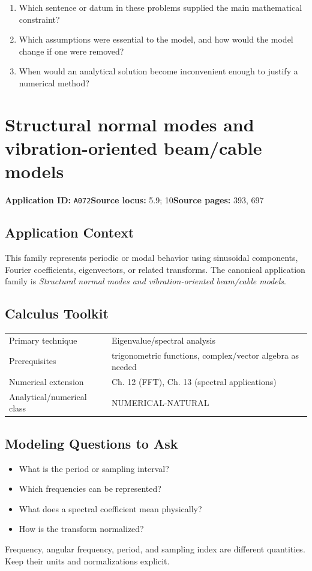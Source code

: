 \documentclass[11pt]{book}
\newcommand{\pid}[1]{\texttt{#1}}
\begin{document}
\begin{reflectionbox}\begin{enumerate}
\item Which sentence or datum in these problems supplied the main mathematical constraint?
\item Which assumptions were essential to the model, and how would the model change if one were removed?
\item When would an analytical solution become inconvenient enough to justify a numerical method?
\end{enumerate}\end{reflectionbox}
\chapter{Structural normal modes and vibration-oriented beam/cable models}\label{app:A072}
\textbf{Application ID:} \pid{A072}\quad \textbf{Source locus:} 5.9; 10\quad \textbf{Source pages:} 393, 697
\section*{Application Context}
This family represents periodic or modal behavior using sinusoidal components, Fourier coefficients, eigenvectors, or related transforms. The canonical application family is \emph{Structural normal modes and vibration-oriented beam/cable models}.
\section*{Calculus Toolkit}
\begin{tabularx}{\textwidth}{@{}lX@{}}\toprule
Primary technique & Eigenvalue/spectral analysis \\
Prerequisites & trigonometric functions, complex/vector algebra as needed \\
Numerical extension & Ch. 12 (FFT), Ch. 13 (spectral applications) \\
Analytical/numerical class & NUMERICAL-NATURAL \\
\bottomrule\end{tabularx}
\section*{Modeling Questions to Ask}\begin{itemize}
\item What is the period or sampling interval?
\item Which frequencies can be represented?
\item What does a spectral coefficient mean physically?
\item How is the transform normalized?
\end{itemize}
\begin{errorbox}Frequency, angular frequency, period, and sampling index are different quantities. Keep their units and normalizations explicit.\end{errorbox}
\end{document}
